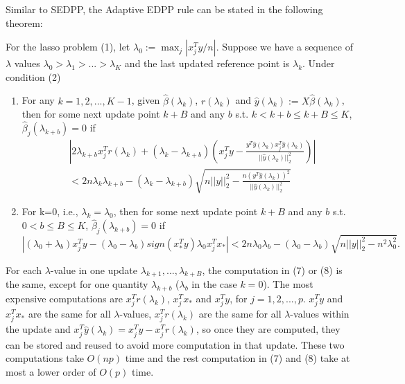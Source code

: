 Similar to SEDPP, the Adaptive EDPP rule can be stated in the following theorem:

\begin{theorem}
    For the lasso problem (1), let $\lambda_0:=\max_j|x_j^Ty/n|$. Suppose we have a sequence of $\lambda$ values $\lambda_0>\lambda_1>...>\lambda_K$ and the last updated reference point is $\lambda_k$. Under condition (2)
    \begin{enumerate}
        \item For any $k=1,2,...,K-1$, given $\hat{\beta}(\lambda_k)$, $r(\lambda_k)$ and $\hat{y}(\lambda_k):=X\hat{\beta}(\lambda_k)$, then for some next update point $k+B$ and any $b$ s.t. $k<k+b\leq k+B\leq K$, $\hat{\beta}_j(\lambda_{k+b})=0$ if
        \begin{equation}
            \begin{split}
                &\left|2\lambda_{k+b}x_j^Tr(\lambda_k)+(\lambda_k-\lambda_{k+b})\left( x_j^Ty-\frac{y^T\hat{y}(\lambda_k)x_j^T\hat{y}(\lambda_k)}{||\hat{y}(\lambda_k)||_2^2}\right)\right|\\&<2n\lambda_k\lambda_{k+b}-(\lambda_k-\lambda_{k+b})\sqrt{n||y||_2^2-\frac{n(y^T\hat{y}(\lambda_k))^2}{||\hat{y}(\lambda_k)||_2^2}}
            \end{split}
        \end{equation}
        \item For k=0, i.e., $\lambda_k=\lambda_0$, then for some next update point $k+B$ and any $b$ s.t. $0<b\leq B\leq K$, $\hat{\beta}_j(\lambda_{k+b})=0$ if
        \begin{equation}
        |(\lambda_0+\lambda_b)x_j^Ty-(\lambda_0-\lambda_b)sign(x_*^Ty)\lambda_0x_j^Tx_*|<2n\lambda_0\lambda_b-(\lambda_0-\lambda_b)\sqrt{n||y||_2^2-n^2\lambda_0^2}.
    \end{equation}
    \end{enumerate}
\end{theorem}

For each $\lambda$-value in one update $\lambda_{k+1},...,\lambda_{k+B}$, the computation in (7) or (8) is the same, except for one quantity $\lambda_{k+b}$ ($\lambda_b$ in the case $k=0$). The most expensive computations are $x_j^Tr(\lambda_k)$, $x_j^Tx_*$ and $x_j^Ty$, for $j=1,2,...,p$. $x_j^Ty$ and $x_j^Tx_*$ are the same for all $\lambda$-values, $x_j^Tr(\lambda_k)$ are the same for all $\lambda$-values within the update and $x_j^T\hat{y}(\lambda_k)=x_j^Ty-x_j^Tr(\lambda_k)$, so once they are computed, they can be stored and reused to avoid more computation in that update. These two computations take $O(np)$ time and the rest computation in (7) and (8) take at most a lower order of $O(p)$ time.


